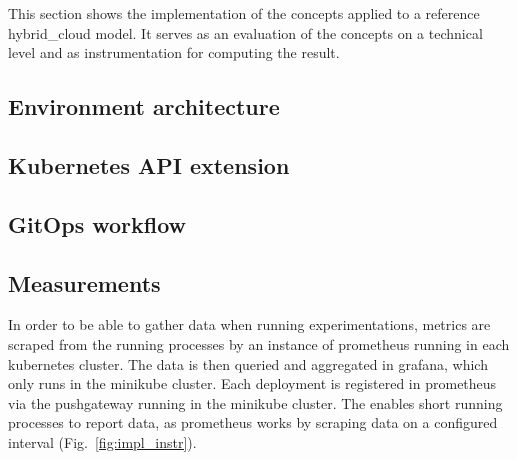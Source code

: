 \documentclass[../main.tex]{subfiles}
\begin{document}
    This section shows the implementation of the concepts applied to a reference \gls{hybrid_cloud} model.
    It serves as an evaluation of the concepts on a technical level and as instrumentation for computing the result.

    \subsection{Environment architecture}
    \label{subsec:impl-env}

    

    \subsection{Kubernetes API extension}
    \label{subsec:impl-manifest}

    

    \subsection{GitOps workflow}
    \label{subsec:impl-pipe}

    

    \subsection{Measurements}
    \label{subsec:impl-instr}

    In order to be able to gather data when running experimentations, metrics are scraped from the running processes by an instance of \gls{prometheus} running in each \gls{kubernetes} cluster.
    The data is then queried and aggregated in \gls{grafana}, which only runs in the \gls{minikube} cluster.
    Each deployment is registered in \gls{prometheus} via the \gls{pushgateway} running in the \gls{minikube} cluster.
    The  enables short running processes to report data, as \gls{prometheus} works by scraping data on a configured interval (Fig.~\ref{fig:impl_instr}).

    
\end{document}
